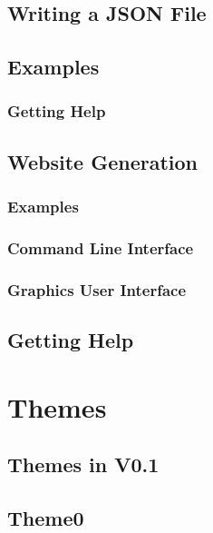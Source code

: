 \documentclass[12pt]{article}
\begin{document}
    \subsection{Writing a JSON File}
    \subsection{Examples}
    \subsubsection{Getting Help}
    \subsection{Website Generation}
    \subsubsection{Examples}
    \subsubsection{Command Line Interface}
    \subsubsection{Graphics User Interface}
    \subsection{Getting Help}
    \section{Themes}
    \subsection{Themes in V0.1}
    \subsection{Theme0}
\end{document}
